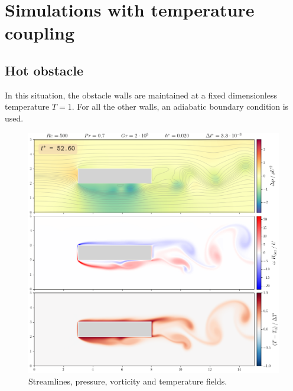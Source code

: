 \documentclass[11 pt]{article}
\begin{document}
%     

%     

%     


\section{Simulations with temperature coupling}

\subsection{Hot obstacle}
In this situation, the obstacle walls are maintained at a fixed dimensionless temperature $T=1$. For all the other walls, an adiabatic boundary condition is used.

\begin{figure}[H]
    \centering
    \includegraphics[width=\textwidth]{../figures/frame_00526_hot_box.png}
    \caption{Streamlines, pressure, vorticity and temperature fields.}
    \label{fig:simu_hot_box}
\end{figure}
\end{document}
